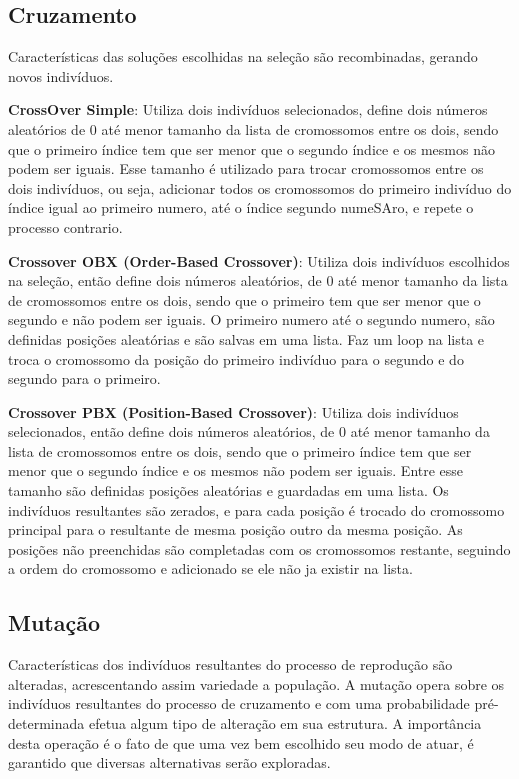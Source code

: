 \subsection{Cruzamento}
Características das soluções escolhidas na seleção são recombinadas, gerando novos indivíduos.

\textbf{CrossOver Simple}: Utiliza dois indivíduos selecionados,  define dois números aleatórios de 0 até menor tamanho da lista de cromossomos entre os dois, 
sendo que o primeiro índice tem que ser menor que o segundo índice e os mesmos não podem ser iguais. 
Esse tamanho é utilizado para trocar cromossomos entre os dois indivíduos, ou seja, adicionar todos os cromossomos do primeiro indivíduo do índice 
igual ao primeiro numero, até o índice segundo numeSAro, e repete o processo contrario.

\textbf{Crossover OBX (Order-Based Crossover)}: Utiliza dois indivíduos escolhidos na seleção, então define dois números aleatórios, de 0 até menor tamanho da lista de cromossomos entre os dois, sendo que o primeiro tem que ser menor que o segundo e não podem ser iguais. O primeiro numero até o segundo numero, são definidas posições aleatórias e são salvas em uma lista. Faz um loop na lista e troca o cromossomo da posição do primeiro indivíduo para o segundo e do segundo para o primeiro.

\textbf{Crossover PBX (Position-Based Crossover)}: Utiliza dois indivíduos selecionados, então define dois números aleatórios, 
de 0 até menor tamanho da lista de cromossomos entre os dois, sendo que o primeiro índice tem que ser menor que o segundo índice e os mesmos não podem ser iguais. 
Entre esse tamanho são definidas posições aleatórias e guardadas em uma lista. Os indivíduos resultantes são zerados, 
e para cada posição é trocado do cromossomo principal para o resultante de mesma posição outro da mesma posição. 
As posições não preenchidas são completadas com os cromossomos restante, seguindo a ordem do cromossomo e adicionado se ele não ja existir na lista.

\subsection{Mutação}
Características dos indivíduos resultantes do processo de reprodução são alteradas, acrescentando assim variedade a população.
A mutação opera sobre os indivíduos resultantes do processo de cruzamento e com uma probabilidade pré-determinada efetua algum tipo de alteração em sua  estrutura. A importância desta operação é o fato de que uma vez bem escolhido seu modo de atuar, é garantido que diversas alternativas serão exploradas.

